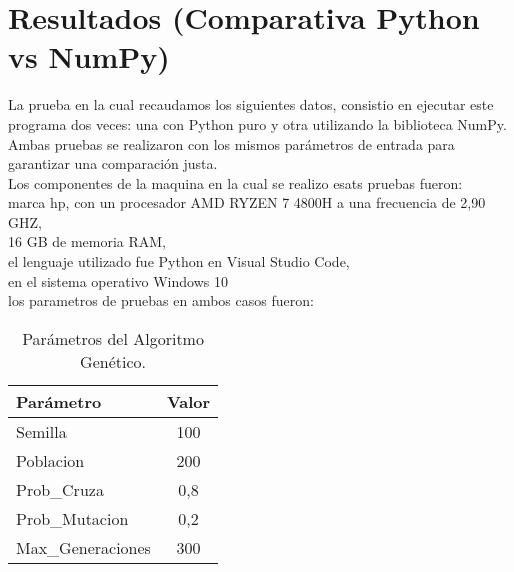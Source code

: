 \documentclass[journal]{IEEEtran}
\begin{document}
\section{Resultados (Comparativa Python vs NumPy)}
La prueba en la cual recaudamos los siguientes datos, consistio en ejecutar este programa dos veces: una con Python puro y otra utilizando la biblioteca NumPy. Ambas pruebas se realizaron con los mismos parámetros de entrada para garantizar una comparación justa.  
\\Los componentes de la maquina en la cual se realizo esats pruebas fueron:
\\marca hp, 
con un procesador AMD RYZEN 7 4800H a una frecuencia de  2,90 GHZ, 
\\ 16 GB de memoria  RAM, 
\\el lenguaje utilizado fue Python en Visual Studio Code, 
\\en el sistema operativo Windows 10
\\los parametros de pruebas en ambos casos fueron: 

 \begin{table}[h!]
\centering
\begin{tabular}{|l|c|}
\hline
\textbf{Parámetro} & \textbf{Valor} \\
\hline
Semilla & 100 \\
\hline
Poblacion & 200 \\
\hline
Prob\_Cruza & 0,8 \\
\hline
Prob\_Mutacion & 0,2 \\
\hline
Max\_Generaciones & 300 \\
\hline
\end{tabular}
\caption{Parámetros del Algoritmo Genético.}
\label{tab:parametros_vertical}
\end{table}
\end{document}
